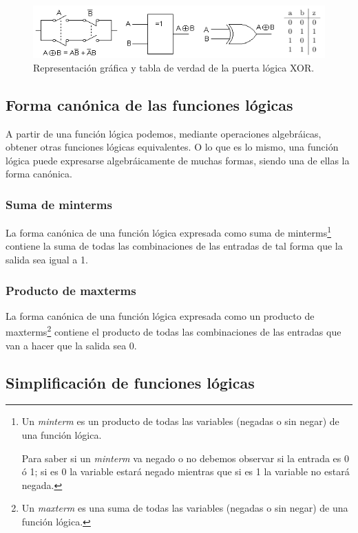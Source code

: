 \documentclass[a4paper, 11pt, titlepage]{article}
\begin{document}
    \begin{figure}[htp]
      \centering
      \includegraphics[width=1\textwidth]{resources/boole-xor.png}
      \caption{Representación gráfica y tabla de verdad de la puerta lógica XOR.}
      \label{boole-xor}
    \end{figure}

	\subsection{Forma canónica de las funciones lógicas}

		A partir de una función lógica podemos, mediante operaciones algebráicas, obtener 
		otras funciones lógicas equivalentes. O lo que es lo mismo, una función lógica puede 
		expresarse algebráicamente de muchas formas, siendo una de ellas la forma canónica.

		\subsubsection{Suma de minterms}

			La forma canónica de una función lógica expresada como suma de minterms\footnote{
				Un \textit{minterm} es un producto de todas las variables (negadas o sin negar)
				de una función lógica.

				Para saber si un \textit{minterm} va negado o no debemos observar si la entrada 
				es 0 ó 1; si es 0 la variable estará negado mientras que si es 1 la variable no 
				estará negada.
			} contiene la suma de todas las combinaciones de las entradas de tal forma que 
			la salida sea igual a 1.

		\subsubsection{Producto de maxterms}

			La forma canónica de una función lógica expresada como un producto de maxterms\footnote{
				Un \textit{maxterm} es una suma de todas las variables (negadas o sin negar) 
				de una función lógica.
			} contiene el producto de todas las combinaciones de las entradas que van a hacer que 
			la salida sea 0.

	\subsection{Simplificación de funciones lógicas}
\end{document}
